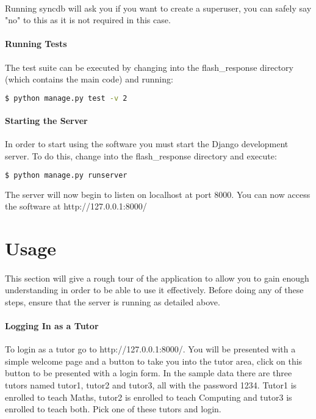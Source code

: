 \documentclass[10pt]{report}
\begin{document}
    \paragraph{}
    Running syncdb will ask you if you want to create a superuser, you can safely say "no" to this as it
    is not required in this case.
    
    \paragraph{Running Tests}
    The test suite can be executed by changing into the flash\_response directory (which contains the main
    code) and running:
    \begin{lstlisting}[language=bash]
    	$ python manage.py test -v 2
    \end{lstlisting}
    
    \paragraph{Starting the Server}
    In order to start using the software you must start the Django development server.  To do this, change
    into the flash\_response directory and execute:
    \begin{lstlisting}[language=bash]
    	$ python manage.py runserver
    \end{lstlisting}
    The server will now begin to listen on localhost at port 8000.  You can now access the software at 
    http://127.0.0.1:8000/
    
    \section*{Usage}
    \paragraph{}
    This section will give a rough tour of the application to allow you to gain enough understanding in
    order to be able to use it effectively.  Before doing any of these steps, ensure that the server is
    running as detailed above.
    
    \paragraph*{Logging In as a Tutor}
    To login as a tutor go to http://127.0.0.1:8000/.  You will be presented with a simple welcome page
    and a button to take you into the tutor area, click on this button to be presented with a login form.
    In the sample data there are three tutors named tutor1, tutor2 and tutor3, all with the password 1234. 
    Tutor1 is enrolled to teach Maths, tutor2 is enrolled to teach Computing and tutor3 is enrolled to
    teach both.  Pick one of these tutors and login.
    
\end{document}
